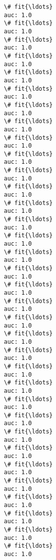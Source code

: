 \documentclass[11pt]{article}
\begin{document}
    \begin{Verbatim}[commandchars=\\\{\}]
\# fit{\ldots}
auc: 1.0
\# fit{\ldots}
auc: 1.0
\# fit{\ldots}
auc: 1.0
\# fit{\ldots}
auc: 1.0
\# fit{\ldots}
auc: 1.0
\# fit{\ldots}
auc: 1.0
\# fit{\ldots}
auc: 1.0
\# fit{\ldots}
auc: 1.0
\# fit{\ldots}
auc: 1.0
\# fit{\ldots}
auc: 1.0
\# fit{\ldots}
auc: 1.0
\# fit{\ldots}
auc: 1.0
\# fit{\ldots}
auc: 1.0
\# fit{\ldots}
auc: 1.0
\# fit{\ldots}
auc: 1.0
\# fit{\ldots}
auc: 1.0
\# fit{\ldots}
auc: 1.0
\# fit{\ldots}
auc: 1.0
\# fit{\ldots}
auc: 1.0
\# fit{\ldots}
auc: 1.0
\# fit{\ldots}
auc: 1.0
\# fit{\ldots}
auc: 1.0
\# fit{\ldots}
auc: 1.0
\# fit{\ldots}
auc: 1.0
\# fit{\ldots}
auc: 1.0
\# fit{\ldots}
auc: 1.0
\# fit{\ldots}
auc: 1.0
\# fit{\ldots}
auc: 1.0
\# fit{\ldots}
auc: 1.0
\# fit{\ldots}
auc: 1.0
\# fit{\ldots}
auc: 1.0
\# fit{\ldots}
auc: 1.0
\# fit{\ldots}
auc: 1.0
\# fit{\ldots}
auc: 1.0

    \end{Verbatim}
\end{document}
